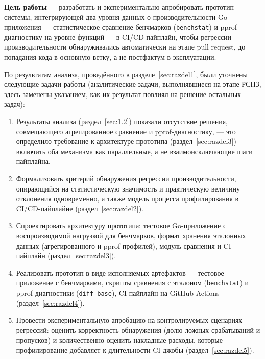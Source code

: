 \textbf{Цель работы} — разработать и экспериментально апробировать прототип
системы, интегрирующей два уровня данных о производительности
Go-приложения — статистическое сравнение бенчмарков (\texttt{benchstat}) и
pprof-диагностику на уровне функций — в CI/CD-пайплайн, чтобы регрессии
производительности обнаруживались автоматически на этапе pull request, до
попадания кода в основную ветку, а не постфактум в эксплуатации.

По результатам анализа, проведённого в разделе~\ref{sec:razdel1}, были
уточнены следующие задачи работы (аналитические задачи, выполнявшиеся на
этапе РСПЗ, здесь заменены указанием, как их результат повлиял на решение
остальных задач):

\begin{enumerate}
\item Результаты анализа (раздел~\ref{sec:1.2}) показали отсутствие
решения, совмещающего агрегированное сравнение и pprof-диагностику, —
это определило требование к архитектуре прототипа (раздел~\ref{sec:razdel3})
включить оба механизма как параллельные, а не взаимоисключающие шаги
пайплайна.
\item Формализовать критерий обнаружения регрессии производительности,
опирающийся на статистическую значимость и практическую величину отклонения
одновременно, а также модель процесса профилирования в CI/CD-пайплайне
(раздел~\ref{sec:razdel2}).
\item Спроектировать архитектуру прототипа: тестовое Go-приложение с
воспроизводимой нагрузкой для бенчмарков, формат хранения эталонных данных
(агрегированного и pprof-профилей), модуль сравнения и CI-пайплайн
(раздел~\ref{sec:razdel3}).
\item Реализовать прототип в виде исполняемых артефактов — тестовое
приложение с бенчмарками, скрипты сравнения с эталоном (\texttt{benchstat})
и pprof-диагностики (\texttt{diff\_base}), CI-пайплайн на GitHub Actions
(раздел~\ref{sec:razdel4}).
\item Провести экспериментальную апробацию на контролируемых сценариях
регрессий: оценить корректность обнаружения (долю ложных срабатываний и
пропусков) и количественно оценить накладные расходы, которые
профилирование добавляет к длительности CI-джобы (раздел~\ref{sec:razdel5}).
\end{enumerate}
